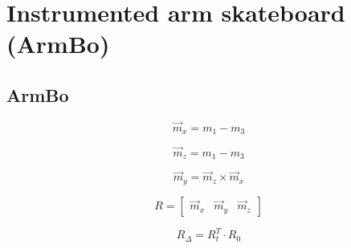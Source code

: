 \documentclass[12pt, twoside]{report}
\begin{document}


\chapter{Instrumented arm skateboard (ArmBo)}

\section{ArmBo}


\begin{equation*}
    \vec{m}_x = m_1 - m_3
\end{equation*}

\begin{equation*}
    \vec{m}_z = m_1 - m_3
\end{equation*}

\begin{equation*}
    \vec{m}_y = \vec{m}_z \times \vec{m}_x
\end{equation*}

\begin{equation*}
    R = \begin{bmatrix}
        \vec{m}_x & \vec{m}_y & \vec{m}_z
    \end{bmatrix}
\end{equation*}

\begin{equation*}
    R_{\Delta} = R_t^{T} \cdot R_{0}
\end{equation*}
\end{document}
